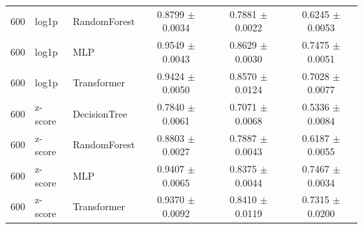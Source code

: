 \begin{longtable}{rllccc}
600 & log1p & RandomForest & 0.8799 $\pm$ 0.0034 & 0.7881 $\pm$ 0.0022 & 0.6245 $\pm$ 0.0053 \\
600 & log1p & MLP & 0.9549 $\pm$ 0.0043 & 0.8629 $\pm$ 0.0030 & 0.7475 $\pm$ 0.0051 \\
600 & log1p & Transformer & 0.9424 $\pm$ 0.0050 & 0.8570 $\pm$ 0.0124 & 0.7028 $\pm$ 0.0077 \\
600 & z-score & DecisionTree & 0.7840 $\pm$ 0.0061 & 0.7071 $\pm$ 0.0068 & 0.5336 $\pm$ 0.0084 \\
600 & z-score & RandomForest & 0.8803 $\pm$ 0.0027 & 0.7887 $\pm$ 0.0043 & 0.6187 $\pm$ 0.0055 \\
600 & z-score & MLP & 0.9407 $\pm$ 0.0065 & 0.8375 $\pm$ 0.0044 & 0.7467 $\pm$ 0.0034 \\
600 & z-score & Transformer & 0.9370 $\pm$ 0.0092 & 0.8410 $\pm$ 0.0119 & 0.7315 $\pm$ 0.0200 \\
\end{longtable}
